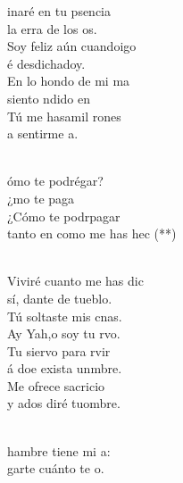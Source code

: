 \begin{cancion}%
	inaré en tu psencia \\
	 la erra de los os.\\
	Soy feliz aún cuandoigo \\
	é desdichadoy.\\
	En lo hondo de mi ma \\
	siento ndido en   \\
	Tú me hasamil rones \\
	a sentirme a. \\\jump\\
	\begin{chorus}%
	ómo te podrégar?\\
	¿mo te paga  \\
	¿Cómo te podrpagar \\
	tanto en como me has hec (**)\\
	\end{chorus}%
	\jump\\
	Viviré cuanto me has dic \\
	sí, dante de tueblo.\\
	Tú soltaste mis cnas.\\
	Ay Yah,o soy tu rvo. \\
	Tu siervo para rvir \\
	á doe exista unmbre.\\
	Me ofrece sacricio  \\
	y ados diré tuombre.\\\jump\\
	\begin{chorus}%
	hambre tiene mi a:\\
	garte cuánto te o.\\

\end{chorus}
\end{cancion}
